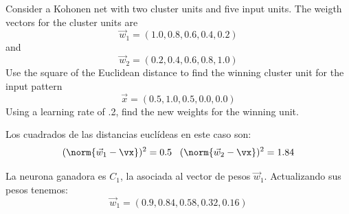 \begin{problem}[4]
Consider a Kohonen net with two cluster units and five input units. The weigth vectors for the cluster units are
\[\vec{w}_1 = (1.0,0.8,0.6,0.4,0.2)\]
and
\[\vec{w}_2 = (0.2, 0.4, 0.6, 0.8, 1.0)\]
Use the square of the Euclidean distance to find the winning cluster unit for the input pattern
\[\vec{x} = (0.5, 1.0, 0.5, 0.0, 0.0)\]
Using a learning rate of .2, find the new weights for the winning unit.
\solution

Los cuadrados de las distancias euclídeas en este caso son:
\[(\norm{\vec{w}_1-\vx})^2 = 0.5\;\;\; (\norm{\vec{w}_2-\vx})^2 = 1.84\]

La neurona ganadora es $C_1$, la asociada al vector de pesos $\vec{w}_1$. Actualizando sus pesos tenemos:
\[\vec{w}_1 = (0.9, 0.84,0.58,0.32, 0.16)\]
\end{problem}

